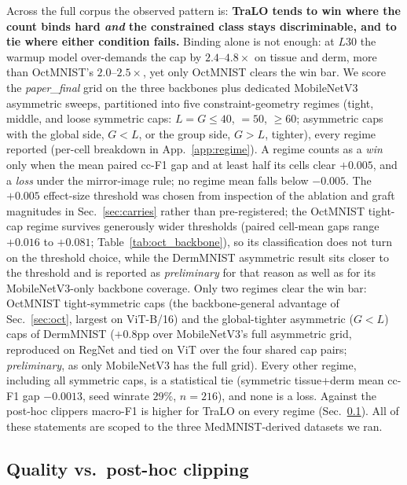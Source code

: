 \documentclass[10pt]{article}
\begin{document}
Across the full corpus the observed pattern is: \textbf{TraLO tends to win
where the count binds hard \emph{and} the constrained class stays
discriminable, and to tie where either condition fails.} Binding alone is not enough: at
$L30$ the warmup model over-demands the cap by $2.4$--$4.8\times$ on tissue
and derm, more than OctMNIST's $2.0$--$2.5\times$, yet only OctMNIST clears
the win bar. We score the \emph{paper\_final} grid on the three backbones
plus dedicated MobileNetV3 asymmetric sweeps, partitioned into five
constraint-geometry regimes (tight, middle, and loose symmetric caps:
$L{=}G{\le}40$, ${=}50$, ${\ge}60$; asymmetric caps with the global side,
$G{<}L$, or the group side, $G{>}L$, tighter), every regime reported
(per-cell breakdown in App.~\ref{app:regime}). A regime counts as a
\emph{win} only when the mean paired cc-F1 gap and at least half its
cells clear $+0.005$, and a \emph{loss} under the mirror-image rule; no
regime mean falls below $-0.005$. The $+0.005$ effect-size threshold
was chosen from inspection of the ablation and graft magnitudes in
Sec.~\ref{sec:carries} rather than pre-registered; the OctMNIST
tight-cap regime survives generously wider thresholds (paired cell-mean
gaps range $+0.016$ to $+0.081$; Table~\ref{tab:oct_backbone}), so its
classification does not turn on the threshold choice, while the
DermMNIST asymmetric result sits closer to the threshold and is
reported as \emph{preliminary} for that reason as well as for its
MobileNetV3-only backbone coverage. Only two regimes clear the win bar:
OctMNIST tight-symmetric caps (the backbone-general advantage of
Sec.~\ref{sec:oct}, largest on ViT-B/16) and the global-tighter
asymmetric ($G{<}L$) caps of DermMNIST ($+0.8$pp over MobileNetV3's full
asymmetric grid, reproduced on RegNet and tied on ViT over the four shared
cap pairs; \emph{preliminary}, as only MobileNetV3 has the full grid).
Every other regime, including all symmetric caps, is a statistical tie
(symmetric tissue+derm mean cc-F1 gap $-0.0013$, seed winrate $29\%$,
$n{=}216$), and none is a loss. Against the post-hoc clippers macro-F1 is
higher for TraLO on every regime (Sec.~\ref{sec:deploy}). All of these
statements are scoped to the three MedMNIST-derived datasets we ran.

\subsection{Quality vs.\ post-hoc clipping}
\label{sec:deploy}
\end{document}
